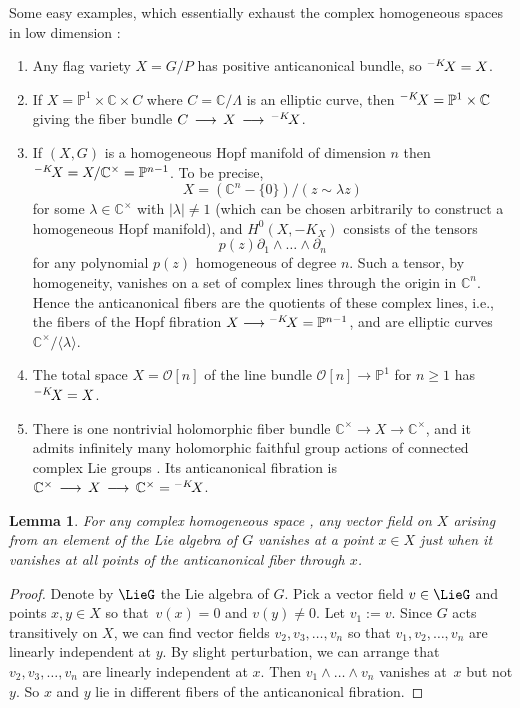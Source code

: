\documentclass[11pt]{article}
\numberwithin{equation}{section}
\providecommand{\C}{\mathbb{C}}
\providecommand{\Proj}[1]{\mathbb{P}^{#1}}
\numberwithin{equation}{section}
\newtheorem{Lemma}[Theorem]{Lemma}
\renewcommand{\C}{\mathbb{C}}
\newcommand{\OO}{\mathcal{O}}
\renewcommand{\Proj}[1]{{\mathbb{P}^{#1}}}
\newcommand*{\acf}[1]{\Iitaka[\acb{}]{#1}}
\begin{document}
\begin{Example}
Some easy examples, which essentially exhaust the complex homogeneous spaces in low dimension \cite{McKay:2015}:
\begin{enumerate}\itemsep=0pt
\item[(1)]
Any flag variety $X = G/P$ has positive anticanonical bundle, so $\acf{X} = X$.
\item[(2)]
If $X = \Proj{1} \times \C \times C$ where $C = \C/\Lambda$ is an elliptic curve, then $\acf{X}
 = \Proj{1} \times \C$ giving the fiber bundle $C \to X \to \acf{X}$.
\item[(3)]
If $(X, G)$ is a homogeneous Hopf manifold of dimension $n$ then $\acf{X} = X/\C^{\times} = \Proj{n-1}$.
To be precise,
\[X = (\C^{n}-\{0\})/(z\sim\lambda z)\]
 for some $\lambda \in \C^{\times}$ with $|\lambda| \ne 1$ (which
can be chosen arbitrarily to construct a homogeneous Hopf manifold), and $H^0(X, -K_X)$ consists of the tensors
\[
p(z)\partial_1\wedge\dots\wedge\partial_n
\]
for any polynomial $p(z)$ homogeneous of degree $n$.
Such a tensor, by homogeneity, vanishes on a set of complex lines through the origin in $\C^{n}$.
Hence the anticanonical fibers are the quotients of these complex lines, i.e., the fibers of the Hopf fibration $X \longrightarrow \acf{X}
 = \Proj{n-1}$, and are elliptic curves $\C^{\times}/\langle \lambda\rangle$.
\item[(4)]
The total space $X = \OO[n]$ of the line bundle $\OO[n] \to \Proj{1}$ for $n \ge 1$ has $\acf{X} = X$.
\item[(5)]
There is one nontrivial holomorphic fiber bundle $\C^{\times} \to X \to \C^{\times}$, and it admits infinitely many holomorphic faithful group actions of connected complex Lie groups \cite{McKay:2015}.
Its anticanonical fibration is $\C^{\times} \to X \to \C^{\times} = \acf{X}$.
\end{enumerate}
\end{Example}

\begin{Lemma}\label{lemma:all.points}
For any complex homogeneous space , any vector field on $X$ arising from an element of the Lie algebra of $G$ vanishes
at a point $x \in X$ just when it vanishes at all points of the anticanonical fiber through $x$.
\end{Lemma}

\begin{proof}
Denote by $\LieG$ the Lie algebra of $G$.
Pick a vector field $v \in \LieG$ and points $x, y \in X$ so that~${v(x) = 0}$ and $v(y) \ne 0$.
Let $v_1 := v$.
Since $G$ acts transitively on $X$, we can find vector fields $v_2, v_3, \dots, v_n$ so that $v_1, v_2,
 \dots, v_n$ are linearly independent at $y$.
By slight perturbation, we can arrange that $v_2, v_3, \dots, v_n$ are linearly independent at $x$.
Then $v_1 \wedge \dots \wedge v_n$ vanishes at~$x$ but not $y$.
So $x$ and $y$ lie in different fibers of the anticanonical fibration.
\end{proof}
\end{document}
